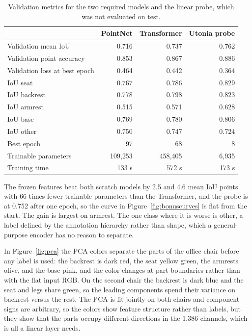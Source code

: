 \documentclass[11pt]{article}
\begin{document}
\begin{table}[htbp]
\centering\small
\begin{tabular}{lrrr}
\toprule
 & PointNet & Transformer & Utonia probe \\
\midrule
Validation mean IoU & 0.716 & 0.737 & 0.762 \\
Validation point accuracy & 0.853 & 0.867 & 0.886 \\
Validation loss at best epoch & 0.464 & 0.442 & 0.364 \\
IoU seat & 0.767 & 0.786 & 0.829 \\
IoU backrest & 0.778 & 0.798 & 0.823 \\
IoU armrest & 0.515 & 0.571 & 0.628 \\
IoU base & 0.769 & 0.780 & 0.806 \\
IoU other & 0.750 & 0.747 & 0.724 \\
Best epoch & 97 & 68 & 8 \\
Trainable parameters & 109{,}253 & 458{,}405 & 6{,}935 \\
Training time & 133 s & 572 s & 173 s \\
\bottomrule
\end{tabular}
\caption{Validation metrics for the two required models and the linear probe, which was not evaluated on test.}
\label{tab:bonus}
\end{table}

The frozen features beat both scratch models by 2.5 and 4.6 mean IoU points with 66 times fewer trainable parameters than the Transformer, and the probe is at 0.752 after one epoch, so the curve in Figure~\ref{fig:bonuscurves} is flat from the start. The gain is largest on armrest. The one class where it is worse is other, a label defined by the annotation hierarchy rather than shape, which a general-purpose encoder has no reason to separate.

In Figure~\ref{fig:pca} the PCA colors separate the parts of the office chair before any label is used: the backrest is dark red, the seat yellow green, the armrests olive, and the base pink, and the color changes at part boundaries rather than with the flat input RGB. On the second chair the backrest is dark blue and the seat and legs share green, so the leading components spend their variance on backrest versus the rest. The PCA is fit jointly on both chairs and component signs are arbitrary, so the colors show feature structure rather than labels, but they show that the parts occupy different directions in the 1{,}386 channels, which is all a linear layer needs.
\end{document}
